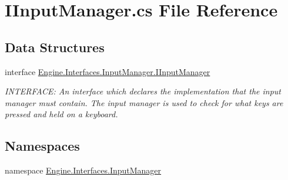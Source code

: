 \hypertarget{a00119}{}\section{I\+Input\+Manager.\+cs File Reference}
\label{a00119}
\subsection*{Data Structures}
\begin{DoxyCompactItemize}
\item 
interface \hyperlink{a00450}{Engine.\+Interfaces.\+Input\+Manager.\+I\+Input\+Manager}
\begin{DoxyCompactList}\small\item\em I\+N\+T\+E\+R\+F\+A\+CE\+: An interface which declares the implementation that the input manager must contain. The input manager is used to check for what keys are pressed and held on a keyboard. \end{DoxyCompactList}\end{DoxyCompactItemize}
\subsection*{Namespaces}
\begin{DoxyCompactItemize}
\item 
namespace \hyperlink{a00260}{Engine.\+Interfaces.\+Input\+Manager}
\end{DoxyCompactItemize}
